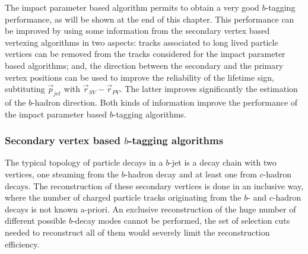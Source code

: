 The impact parameter based algorithm permits to obtain a very good $b$-tagging performance, as will be shown at the end of this chapter. 
This performance can be improved by using some information from the secondary vertex based vertexing algorithms in two aspects: tracks associated to long lived particle vertices can be removed from the tracks considered for the impact parameter based algorithms; and, the direction between the secondary and the primary vertex positions can be used to improve the reliability of the lifetime sign, subtituting $\vec{p}_{jet}$ with $\vec{r}_{SV} - \vec{r}_{PV} $. The latter improves significantly the estimation of the $b$-hadron direction. Both kinds of information improve the performance of the impact parameter based $b$-tagging algorithms.


\subsubsection{Secondary vertex based $b$-tagging algorithms }

The typical topology of particle decays in a $b$-jet is a decay chain with two vertices, one steaming from the $b$-hadron decay and at least one from $c$-hadron decays. The reconstruction of these secondary vertices is done in an inclusive way, where the number of charged particle tracks originating from the $b$- and $c$-hadron decays is not known a-priori. An exclusive reconstruction of the huge number of different possible $b$-decay modes cannot be performed, the set of selection cuts needed to reconstruct all of them would severely limit the reconstruction efficiency.

